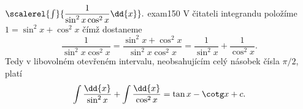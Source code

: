 \begin{mathexam}{\(\scalerel{\int}{\dfrac{1}{\sin^2x\cos^2x}\dd{x}}.\)
  \hfill\cite[s.~31]{Knichal}}{exam150} 
  V čitateli integrandu položíme \(1=\sin^2x +\cos^2x\) čímž dostaneme
  \[\dfrac{1}{\sin^2x\cos^2x} = \dfrac{\sin^2x +\cos^2x}{\sin^2x\cos^2x} 
                              = \dfrac{1}{\sin^2x} + \dfrac{1}{\cos^2x}.\]
  Tedy v libovolném otevřeném intervalu, neobsahujícím celý násobek čísla \(\pi/2\), platí
  \begin{equation*}
    \int\dfrac{\dd{x}}{\sin^2x} + \int\dfrac{\dd{x}}{\cos^2x} = \tan x - \cotg x + c.
  \end{equation*}
\end{mathexam}